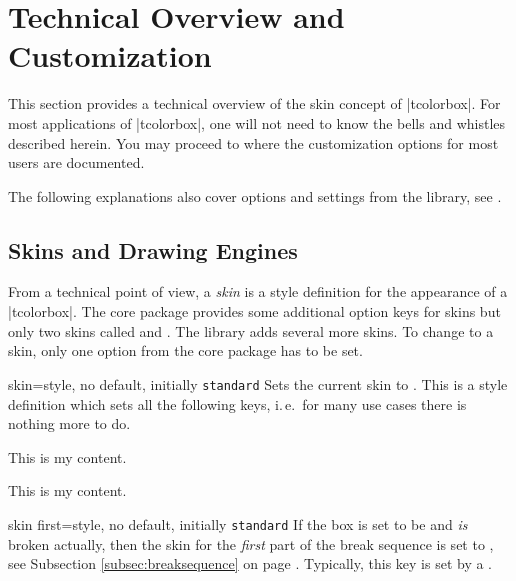 \clearpage
\section{Technical Overview and Customization}\label{sec:technical}%
%
This section provides a technical overview of the skin concept of |tcolorbox|.
For most applications of |tcolorbox|, one will not need to know the bells and
whistles described herein.
You may proceed to  where the customization options
for most users are documented.

The following explanations also cover options and settings from the  library,
see  .

\subsection{Skins and Drawing Engines}\label{sec:skincorekeys}
From a technical point of view, a \emph{skin} is a style definition for the
appearance of a |tcolorbox|. The core package provides some additional
option keys for skins but only two skins called 
and .
The  library adds several more skins. To change to a skin, only one
option from the core package has to be set.

\begin{docTcbKey}{skin}{=}{style, no default, initially \texttt{standard}}
  Sets the current skin to . This is a style definition which sets all the following
  keys, i.\,e.\ for many use cases there is nothing more to do.
\begin{dispExample}

\begin{tcolorbox}[adjusted title=My title]
  This is my content.
\end{tcolorbox}
\begin{tcolorbox}[beamer,adjusted title=My title]
  This is my content.
\end{tcolorbox}
\end{dispExample}
\end{docTcbKey}

\begin{docTcbKey}{skin first}{=}{style, no default, initially \texttt{standard}}
  If the box is set to be  and \emph{is} broken actually,
  then the skin for the \emph{first} part of the break sequence
  is set to , see Subsection \ref{subsec:breaksequence} on page \pageref{subsec:breaksequence}.
  Typically, this key is set by a .
\end{docTcbKey}


